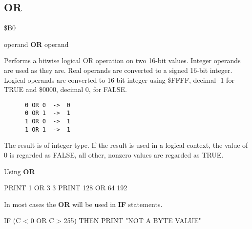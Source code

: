 
\newpage
\subsection{OR}
\begin{description}[leftmargin=3cm,style=nextline]
\item [Token:] \$B0
\item [Format:] operand {\bf OR} operand
\item [Usage:]  Performs a bitwise
                logical OR operation on two 16-bit values.
                Integer operands are used as they are.
                Real operands are converted to a signed 16-bit integer.
                Logical operands are converted to 16-bit integer
                using \$FFFF, decimal -1 for TRUE
                and \$0000, decimal 0, for FALSE.

   \begin{verbatim}
      0 OR 0  ->  0
      0 OR 1  ->  1
      1 OR 0  ->  1
      1 OR 1  ->  1
   \end{verbatim}

\item [Remarks:] The result is of integer type.
                 If the result is used in a logical context,
                 the value of 0 is regarded as FALSE,
                 all other, nonzero values are regarded as TRUE.
\item [Example:] Using {\bf OR}

\begin{screenoutput}
  PRINT 1 OR 3
  3
  PRINT 128 OR 64
  192
\end{screenoutput}

In most cases the {\bf OR} will be used in {\bf IF} statements.

\begin{screenoutput}
   IF (C < 0 OR C > 255) THEN PRINT "NOT A BYTE VALUE"
\end{screenoutput}
\end{description}


\newpage
